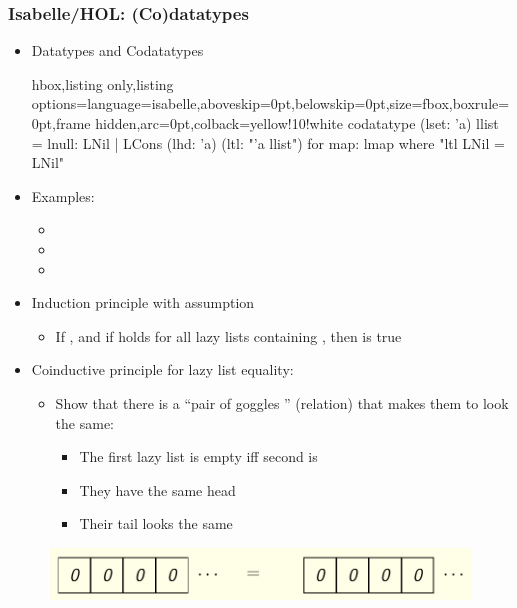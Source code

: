 \documentclass[aspectratio=169,10pt]{beamer}
\begin{document}
\begin{frame}
  \frametitle{Isabelle/HOL: (Co)datatypes}
  \begin{itemize}
    \item Datatypes and Codatatypes
\vspace*{-1ex}
          \begin{tcblisting}{hbox,listing only,listing options={language=isabelle,aboveskip=0pt,belowskip=0pt},size=fbox,boxrule=0pt,frame hidden,arc=0pt,colback=yellow!10!white}
codatatype (lset: 'a) llist = lnull: LNil | LCons (lhd: 'a) (ltl: "'a llist")
  for map: lmap where "ltl LNil = LNil"
          \end{tcblisting}
\vspace*{-1ex}
    \item Examples:
          \begin{itemize}
            \item {}
            \item {}
            \item {}
          \end{itemize}
\vspace*{-1ex}
    \item Induction principle with  assumption
          \begin{itemize}
            \item If , and if  holds for all lazy lists containing , then  is true
          \end{itemize}
    \item Coinductive principle for lazy list equality:
          \begin{itemize}
            \item Show that there is a ``pair of goggles '' (relation) that makes them to look the same:
                  \begin{itemize}
                    \item The first lazy list is empty iff second is
                    \item They have the same head
                    \item Their tail looks the same
                  \end{itemize}
          \end{itemize}
  \end{itemize}
\vspace*{-1ex}
\begin{overlayarea}{\textwidth}{.45\textheight}
  \begin{figure}
    \centering
    \includegraphics[scale=0.3]{equality.png}
  \end{figure}
\end{overlayarea}
\end{frame}
\end{document}
